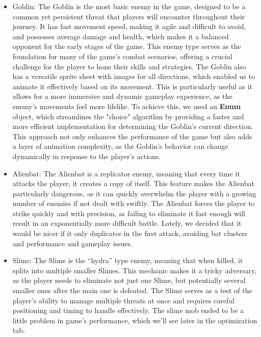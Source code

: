 \documentclass[a4paper,12pt]{article}
\begin{document}
\begin{itemize}
 \item Goblin: The Goblin is the most basic enemy in the game, designed to be a common yet persistent threat that players will encounter throughout their journey. It has fast movement speed, making it agile and difficult to avoid, and possesses average damage and health, which makes it a balanced opponent for the early stages of the game. This enemy type serves as the foundation for many of the game's combat scenarios, offering a crucial challenge for the player to hone their skills and strategies. The Goblin also has a versatile sprite sheet with images for all directions, which enabled us to animate it effectively based on its movement. This is particularly useful as it allows for a more immersive and dynamic gameplay experience, as the enemy's movements feel more lifelike. To achieve this, we used an \textbf{Enum} object, which streamlines the "choice" algorithm by providing a faster and more efficient implementation for determining the Goblin's current direction. This approach not only enhances the performance of the game but also adds a layer of animation complexity, as the Goblin's behavior can change dynamically in response to the player's actions.

  
  \item Alienbat: The Alienbat is a replicator enemy, meaning that every time it attacks the player, it creates a copy of itself. This feature makes the Alienbat particularly dangerous, as it can quickly overwhelm the player with a growing number of enemies if not dealt with swiftly. The Alienbat forces the player to strike quickly and with precision, as failing to eliminate it fast enough will result in an exponentially more difficult battle. Lately, we decided that it would be nicer if it only duplicates in the first attack, avoiding bat clusters and performance and gameplay issues.
  

  \item Slime: The Slime is the “hydra” type enemy, meaning that when killed, it splits into multiple smaller Slimes. This mechanic makes it a tricky adversary, as the player needs to eliminate not just one Slime, but potentially several smaller ones after the main one is defeated. The Slime serves as a test of the player's ability to manage multiple threats at once and requires careful positioning and timing to handle effectively. The slime mob ended to be a little problem in game's performance, which we'll see later in the optimization tab. 


\end{itemize}
\end{document}
